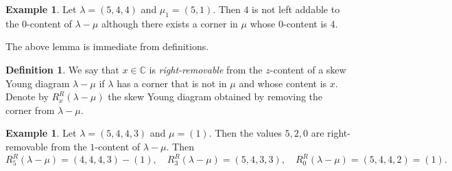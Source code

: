 \documentclass[11pt]{amsart}
\numberwithin{equation}{section}
\theoremstyle{definition}
\newtheorem{lemma}[thm]{Lemma}
\newtheorem{definition}[thm]{Definition}
\newtheorem{example}[thm]{Example}
\begin{document}
\begin{example}
Let \( \lambda=(5,4,4)\) and \(\mu_1=(5,1)\). Then \(4\) is not left addable to the \(0\)-content of \(\lambda-\mu\) although there exists a corner in \(\mu\) whose \(0\)-content is \(4\).
\end{example}




The above lemma is immediate from definitions. 




\begin{definition} \label{def right removable} 
We say that $x \in \mathbb C$ is \textit{right-removable} from the $z$-content of a skew Young diagram $\lambda-\mu$ if $\lambda$ has a corner that is not in $\mu$ and whose content is $x$. Denote by $R^R_x(\lambda-\mu)$ the skew Young diagram obtained by removing the corner from $\lambda-\mu$.

\end{definition}


\begin{example}
Let $\lambda=(5,4,4, 3)$ and $\mu=(1)$. Then the values $5, 2, 0$ are right-removable from the $1$-content of $\lambda-\mu$. Then 
\[  R^R_5(\lambda-\mu)=(4,4,4,3)-(1), \quad R^R_3(\lambda-\mu)=(5,4,3,3) , \quad R^R_0(\lambda-\mu)=(5,4,4,2)=(1) .\]
\end{example}



\end{document}
